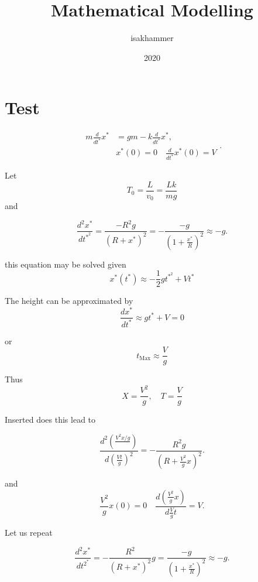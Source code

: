 \documentclass{article}
\title{Mathematical Modelling}
\author{isakhammer }
\date{2020}
\theoremstyle{remark}
\begin{document}
\maketitle
\tableofcontents
\newpage

\newpage
\section{Test}%
\label{sec:test}

\begin{equation}
\label{eq:n1}
  \begin{split}
    m \frac{d}{dt^{*}} x^{*} &=  gm - k \frac{d}{dt ^{*}} x^{*} , \\
     & x^{*} \left( 0 \right) = 0  \quad  \frac{d}{dt ^{*}} x^{*}\left( 0 \right) =V
  \end{split}
.\end{equation}



Let \[
T_{0} = \frac{L}{v_{0}} = \frac{Lk}{mg} 
\] 
and

\begin{equation*}
  \frac{d ^2 x ^{*}}{d t^{*}^2} = \frac{- R^2 g}{\left( R + x^{*} \right)^2} = - \frac{-g}{ \left( 1 + \frac{x^{*}}{R} \right)^2} \approx  -g 
.\end{equation*}

this equation may be solved given \[
x^{*}\left( t^{*} \right) \approx -  \frac{1}{2} g t^{*}^2 + V t^{*}
\] 

The height can be approximated by \[
\frac{d x^{*}}{d t^{*}}  \approx gt^{*} + V = 0 
\] 

or \[
t_{\text{Max}} \approx  \frac{V}{g}
\] 

Thus \[
X = \frac{V^2}{g}, \quad  T = \frac{V}{g} 
\] 

Inserted does this lead to 

\begin{equation*}
  \frac{d ^2 \left( \frac{V^2x / g}{} \right)}{d \left( \frac{Vt}{g} \right)^2} = - \frac{R^2g}{ \left( R + \frac{V^2}{g}x \right)^2} 
.\end{equation*}

and 
\begin{equation*}
  \frac{V^2}{g}x\left( 0 \right) = 0 \quad  \frac{d \left( \frac{V^2}{g}x \right)}{d \frac{V}{g}t} = V 
.\end{equation*}

Let us repeat 

\begin{equation*}
  \frac{d ^2 x^{*}}{d t^2^{*}}  = - \frac{R^2}{\left( R + x^{*} \right)^2} g  = \frac{-g}{\left( 1 + \frac{x^{*}}{R} \right)^2} \approx -g
.\end{equation*}
\end{document}
